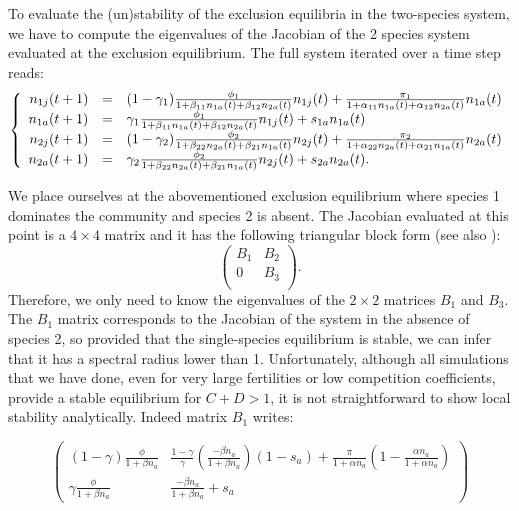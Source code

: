 \documentclass{article}
\begin{document}
To evaluate the (un)stability of the exclusion equilibria in the two-species system, we have to compute the eigenvalues of the Jacobian of the 2 species system evaluated at the exclusion equilibrium. The full system iterated over a time step reads:
\begin{equation}
    \left\{
\begin{array}{r c l}
n_{1j}(t+1) &=& (1-\gamma_1)\frac{\phi_1}{1+\beta_{11}n_{1a}(t)+\beta_{12}n_{2a}(t)}n_{1j}(t) + \frac{\pi_1}{1+\alpha_{11}n_{1a}(t)+\alpha_{12}n_{2a}(t)}n_{1a}(t)\\
n_{1a}(t+1) &=& \gamma_1 \frac{\phi_1}{1+\beta_{11}n_{1a}(t)+\beta_{12}n_{2a}(t)}n_{1j}(t) + s_{1a}n_{1a}(t)\\
n_{2j}(t+1) &=& (1-\gamma_2)\frac{\phi_2}{1+\beta_{22}n_{2a}(t)+\beta_{21}n_{1a}(t)}n_{2j}(t) + \frac{\pi_2}{1+\alpha_{22}n_{2a}(t)+\alpha_{21}n_{1a}(t)}n_{2a}(t)\\
n_{2a}(t+1) &=& \gamma_2 \frac{\phi_2}{1+\beta_{22}n_{2a}(t)+\beta_{21}n_{1a}(t)}n_{2j}(t) + s_{2a}n_{2a}(t).
\end{array}
\right.
\end{equation}

We place ourselves at the abovementioned exclusion equilibrium where species 1 dominates the community and species 2 is absent. The Jacobian evaluated at this point is a $4 \times 4$ matrix and it has the following triangular block form (see also \citealt{cushing2008matrix}):
\begin{equation}
    \begin{pmatrix}
    B_1 & B_2 \\
    0 & B_3 \\
    \end{pmatrix}.
\end{equation}
Therefore, we only need to know the eigenvalues of the $2 \times 2$ matrices $B_1$ and $B_3$. 
The $B_1$ matrix corresponds to the Jacobian of the system in the absence of species 2, so provided that the single-species equilibrium is stable, we can infer that it has a spectral radius lower than 1. Unfortunately, although all simulations that we have done, even for very large fertilities or low competition coefficients, provide a stable equilibrium for $C+D>1$, it is not straightforward to show local stability analytically. Indeed matrix $B_1$ writes:

\begin{equation}
    \begin{pmatrix}
        (1-\gamma) \frac{\phi}{1+\beta n_a} & \frac{1-\gamma}{\gamma} \left( \frac{-\beta n_a}{1+\beta n_a}\right) (1-s_a) + \frac{\pi}{1+\alpha n_a} \left( 1-\frac{\alpha n_a}{1+\alpha n_a}\right)\\
        \gamma \frac{\phi}{1+\beta n_a} & \frac{-\beta n_a}{1+\beta n_a}+s_a
    \end{pmatrix}
\end{equation}
\end{document}

